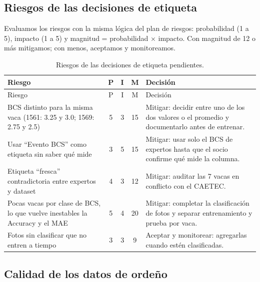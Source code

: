 \documentclass[11pt,letterpaper,DIV=12]{scrartcl}
\begin{document}
\subsection{Riesgos de las decisiones de etiqueta}

Evaluamos los riesgos con la misma lógica del plan de riesgos: probabilidad (1 a 5), impacto (1 a 5) y magnitud = probabilidad $\times$ impacto. Con magnitud de 12 o más mitigamos; con menos, aceptamos y monitoreamos. 

\begin{small}
\begin{longtable}{L{4.2cm}ccc L{6.3cm}}
\caption{Riesgos de las decisiones de etiqueta pendientes.}\\
\toprule
Riesgo & P & I & M & Decisión \\
\midrule
\endfirsthead
\toprule
Riesgo & P & I & M & Decisión \\
\midrule
\endhead
\bottomrule
\endfoot
BCS distinto para la misma vaca (1561: 3.25 y 3.0; 1569: 2.75 y 2.5) & 5 & 3 & 15 & Mitigar: decidir entre uno de los dos valores o el promedio y documentarlo antes de entrenar. \\
Usar ``Evento BCS'' como etiqueta sin saber qué mide & 3 & 5 & 15 & Mitigar: usar solo el BCS de expertos hasta que el socio confirme qué mide la columna. \\
Etiqueta ``fresca'' contradictoria entre expertos y dataset & 4 & 3 & 12 & Mitigar: auditar las 7 vacas en conflicto con el CAETEC. \\
Pocas vacas por clase de BCS, lo que vuelve inestables la Accuracy y el MAE & 5 & 4 & 20 & Mitigar: completar la clasificación de fotos y separar entrenamiento y prueba por vaca. \\
Fotos sin clasificar que no entren a tiempo & 3 & 3 & 9 & Aceptar y monitorear: agregarlas cuando estén clasificadas. \\
\end{longtable}
\end{small}

\subsection{Calidad de los datos de ordeño}
\end{document}
